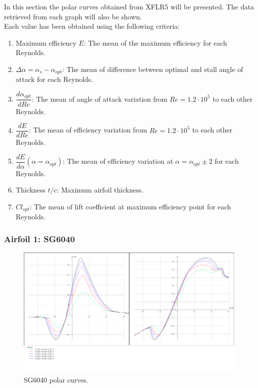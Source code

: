 \documentclass[../TFG_Annex.tex]{subfiles}
\begin{document}
In this section the polar curves obtained from XFLR5 will be presented. The data retrieved from each graph will also be shown. \\

Each value has been obtained using the following criteria: 

\begin{enumerate}
	
\item Maximum efficiency $E$: The mean of the maximum efficiency for each Reynolds.

\item $\Delta \alpha=\alpha_{s}-\alpha_{opt}$: The mean of difference between optimal and stall angle of attack for each Reynolds.

\item $\dfrac{d\alpha_{opt}}{dRe}$: The mean of angle of attack variation from $Re=1.2\cdot10^5$ to each other Reynolds. 

\item $\dfrac{dE}{dRe}$: The mean of efficiency variation from $Re=1.2\cdot10^5$ to each other Reynolds. 

\item $\dfrac{dE}{d \alpha} (\alpha=\alpha_{opt})$: The mean of efficiency variation at $\alpha = \alpha_{opt} \pm 2$ for each Reynolds. 

\item Thickness $t/c$: Maximum airfoil thickness.

\item $Cl_{opt}$: The mean of lift coefficient at maximum efficiency point for each Reynolds. 

\end{enumerate}


\newpage

\subsubsection{Airfoil 1: SG6040}

\begin{figure}[h!]
	\centering
	\includegraphics[width=1\linewidth]{"../../04-Airfoil selection/Imatges airfoils/1-SG6040"}
	\caption{SG6040 polar curves.}
	\label{fig:1-sg6040}
\end{figure}
\end{document}

